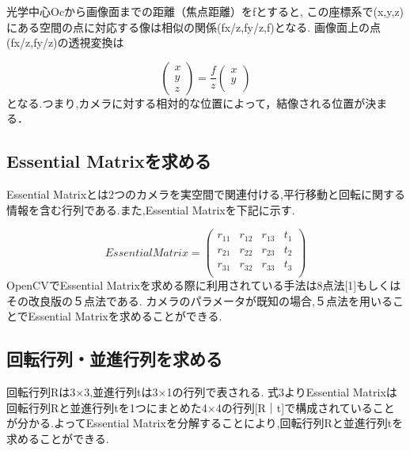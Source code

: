 \documentclass[11pt]{si2016}
\begin{document}
光学中心Ocから画像面までの距離（焦点距離）をfとすると,
この座標系で(x,y,z)にある空間の点に対応する像は相似の関係(fx/z,fy/z,f)となる.
画像面上の点(fx/z,fy/z)の透視変換は

\begin{equation}
\left(
    \begin{array}{c}
      x \\
      y \\
      z 
    \end{array}
  \right)=\frac{f}{z} \left(
    \begin{array}{c}
      x \\
      y \\
       
    \end{array}
  \right)
\end{equation}
となる.つまり,カメラに対する相対的な位置によって，結像される位置が決まる．

\subsection{Essential Matrixを求める}
Essential Matrixとは2つのカメラを実空間で関連付ける,平行移動と回転に関する情報を含む行列である.また,Essential Matrixを下記に示す.

\begin{equation}
       Essential Matrix = \left(
    \begin{array}{cccc}
      r _{11} & r _{12} & r _{13} & t_1\\
      r _{21} & r _{22} & r _{23} & t_2\\
      r _{31} & r _{32} & r _{33} & t_3\\

    \end{array}
  \right)
\end{equation}
OpenCVでEssential Matrixを求める際に利用されている手法は8点法{\scriptsize[1]}もしくはその改良版の５点法である.
カメラのパラメータが既知の場合,５点法を用いることでEssential Matrixを求めることができる.


\subsection{回転行列・並進行列を求める}
回転行列Rは3×3,並進行列tは3×1の行列で表される.
式3よりEssential Matrixは回転行列Rと並進行列tを1つにまとめた4×4の行列[R｜t]で構成されていることが分かる.よってEssential Matrixを分解することにより,回転行列Rと並進行列tを求めることができる.
\end{document}

